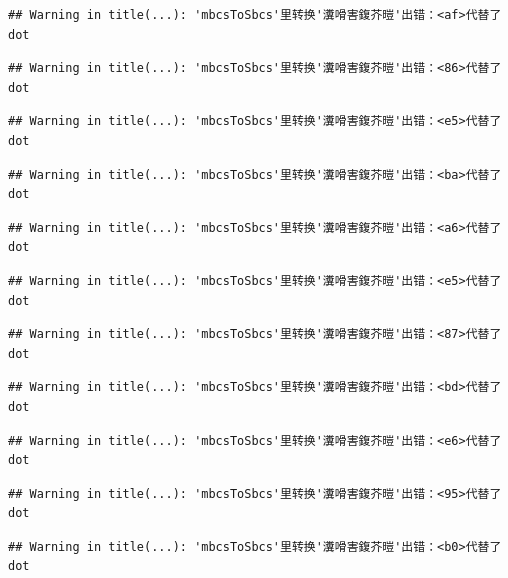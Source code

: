 \documentclass[
]{book}
\begin{document}
\begin{verbatim}
## Warning in title(...): 'mbcsToSbcs'里转换'瀵嗗害鍑芥暟'出错：<af>代替了dot
\end{verbatim}

\begin{verbatim}
## Warning in title(...): 'mbcsToSbcs'里转换'瀵嗗害鍑芥暟'出错：<86>代替了dot
\end{verbatim}

\begin{verbatim}
## Warning in title(...): 'mbcsToSbcs'里转换'瀵嗗害鍑芥暟'出错：<e5>代替了dot
\end{verbatim}

\begin{verbatim}
## Warning in title(...): 'mbcsToSbcs'里转换'瀵嗗害鍑芥暟'出错：<ba>代替了dot
\end{verbatim}

\begin{verbatim}
## Warning in title(...): 'mbcsToSbcs'里转换'瀵嗗害鍑芥暟'出错：<a6>代替了dot
\end{verbatim}

\begin{verbatim}
## Warning in title(...): 'mbcsToSbcs'里转换'瀵嗗害鍑芥暟'出错：<e5>代替了dot
\end{verbatim}

\begin{verbatim}
## Warning in title(...): 'mbcsToSbcs'里转换'瀵嗗害鍑芥暟'出错：<87>代替了dot
\end{verbatim}

\begin{verbatim}
## Warning in title(...): 'mbcsToSbcs'里转换'瀵嗗害鍑芥暟'出错：<bd>代替了dot
\end{verbatim}

\begin{verbatim}
## Warning in title(...): 'mbcsToSbcs'里转换'瀵嗗害鍑芥暟'出错：<e6>代替了dot
\end{verbatim}

\begin{verbatim}
## Warning in title(...): 'mbcsToSbcs'里转换'瀵嗗害鍑芥暟'出错：<95>代替了dot
\end{verbatim}

\begin{verbatim}
## Warning in title(...): 'mbcsToSbcs'里转换'瀵嗗害鍑芥暟'出错：<b0>代替了dot
\end{verbatim}
\end{document}
